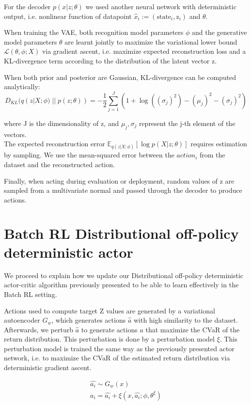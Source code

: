 For the decoder $p(x|z; \theta)$ we used another neural network with deterministic output, i.e. nonlinear function of 
datapoint $\hat x_i:=(\text{state}_i,\text{z}_i)$ and $\theta$.

When training the VAE, both recognition model parameters $\phi$ and the generative model parameters $\theta$ are
learnt jointly to maximize the variational lower bound $\mathcal{L}(\theta, \phi; X)$ via gradient ascent, i.e.
maximize expected reconstruction loss and a KL-divergence term according to the distribution of
the latent vector z.

When both prior and posterior are Gaussian, KL-divergence can be computed analytically:
\begin{equation}
    D_{KL}(q(z|X;\phi)\; ||\;p(z; \theta)) = -\frac{1}{2}\sum_{j=1}^J (1+\log((\sigma_j)^2)-(\mu_j)^2-(\sigma_j)^2) \label{eq:kl_div}
\end{equation}

where J is the dimensionality of z, and $\mu_j,\sigma_j$ represent the j-th element of the vectors.\\
The expected reconstruction error 
$\mathbb E_{q(z|X;\phi)} [\log p(X|z; \theta)]$
requires estimation by sampling. We use the mean-squared error between the $action_i$
from the dataset and the reconstructed action.

Finally, when acting during evaluation or deployment, random values of z are sampled from a
multivariate normal and passed through the decoder to produce actions.

\section{Batch RL Distributional off-policy deterministic actor}
We proceed to explain how we update our Distributional off-policy deterministic actor-critic algorithm previously
presented to be able to learn effectively in the Batch RL setting.

Actions used to compute target Z values are generated by a variational autoencoder $G_w$,
which generates actions $\hat{a}$ with high  similarity  to  the  dataset.  
Afterwards, we perturb $\hat{a}$  to generate actions $a$ that maximize the CVaR of the return
distribution. This perturbation is done by a perturbation model $\xi$.
This perturbation model is trained the same way as the previously presented actor network,
i.e. to maximize the CVaR of the estimated return distribution via deterministic gradient ascent.

\begin{align}
    \hat{a_i} \sim G_w(x)\\
    a_i =  \hat{a_i} + \xi(x,\hat{a_i};\phi,\theta^\xi)
\end{align}

